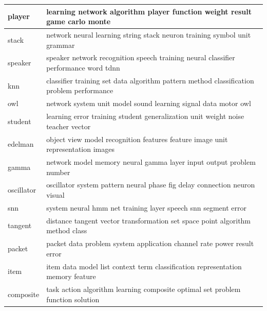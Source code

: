 \documentclass{article}
\begin{document}
\begin{tabular}{ l | l }
    player & learning network algorithm player function weight result game carlo monte \\ \hline 
    stack & network neural learning string stack neuron training symbol unit grammar \\ \hline 
    speaker & speaker network recognition speech training neural classifier performance word tdnn \\ \hline 
    knn & classifier training set data algorithm pattern method classification problem performance \\ \hline 
    owl & network system unit model sound learning signal data motor owl \\ \hline 
    student & learning error training student generalization unit weight noise teacher vector \\ \hline 
    edelman & object view model recognition features feature image unit representation images \\ \hline 
    gamma & network model memory neural gamma layer input output problem number \\ \hline 
    oscillator & oscillator system pattern neural phase fig delay connection neuron visual \\ \hline 
    snn & system neural hmm net training layer speech snn segment error \\ \hline 
    tangent & distance tangent vector transformation set space point algorithm method class \\ \hline 
    packet & packet data problem system application channel rate power result error \\ \hline 
    item & item data model list context term classification representation memory feature \\ \hline 
    composite & task action algorithm learning composite optimal set problem function solution \\ \hline
\end{tabular}  
    
\end{document}
